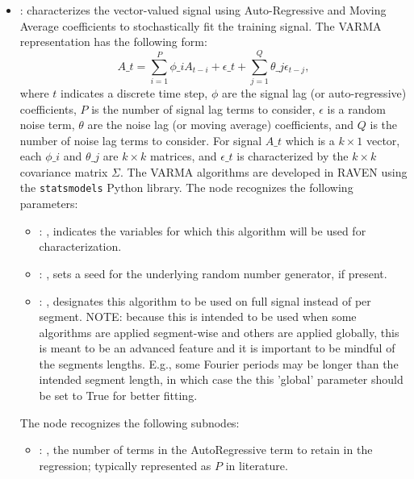 \begin{itemize}
    \item {}:
      characterizes the vector-valued signal using Auto-Regressive and Moving         Average
      coefficients to stochastically fit the training signal.         The VARMA representation has
      the following form:         \begin{equation*}           A\_t = \sum_{i=1}^P \phi\_i A_{t-i} +
      \epsilon\_t + \sum_{j=1}^Q \theta\_j \epsilon_{t-j},         \end{equation*}         where $t$
      indicates a discrete time step, $\phi$ are the signal lag (or auto-regressive)
      coefficients, $P$ is the number of signal lag terms to consider, $\epsilon$ is a random noise
      term, $\theta$ are the noise lag (or moving average) coefficients, and $Q$ is the number of
      noise lag terms to consider. For signal $A\_t$ which is a $k \times 1$ vector, each $\phi\_i$
      and $\theta\_j$ are $k \times k$ matrices, and $\epsilon\_t$ is characterized by the         $k
      \times k$ covariance matrix $\Sigma$. The VARMA algorithms are developed in RAVEN using the
      \texttt{statsmodels} Python library.
      The  node recognizes the following parameters:
        \begin{itemize}
          \item {}: ,
            indicates the variables for which this algorithm will be used for characterization.
          \item {}: ,
            sets a seed for the underlying random number generator, if present.
          \item {}: ,
            designates this algorithm to be used on full signal instead of per
            segment. NOTE: because this is intended to be used when some algorithms are
            applied segment-wise and others are applied globally, this is meant to be an
            advanced feature and it is important to be mindful of the segments lengths.
            E.g., some Fourier periods may be longer than the intended segment length, in
            which case the this 'global' parameter should be set to True for better
            fitting. 
      \end{itemize}

      The  node recognizes the following subnodes:
      \begin{itemize}
        \item {}: ,
          the number of terms in the AutoRegressive term to retain in the
          regression; typically represented as $P$ in literature.


\end{itemize}
\end{itemize}
